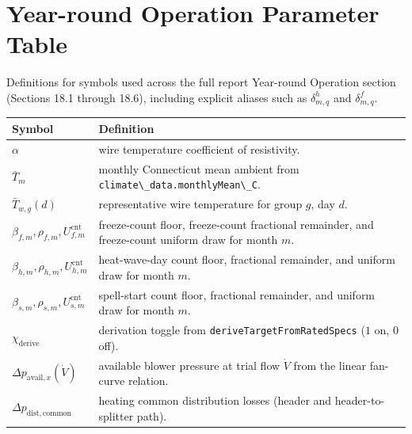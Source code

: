 \section{Year-round Operation Parameter
Table}\label{year-round-operation-parameter-table}

Definitions for symbols used across the full report Year-round Operation
section (Sections 18.1 through 18.6), including explicit aliases such as
\(\delta^h_{m,q}\) and \(\delta^f_{m,q}\).

{\def\LTcaptype{none} %
\begin{longtable}[]{@{}
  >{\raggedright\arraybackslash}p{}
  >{\raggedright\arraybackslash}p{}@{}}
\toprule\noalign{}
\begin{minipage}[b]{\linewidth}\raggedright
Symbol
\end{minipage} & \begin{minipage}[b]{\linewidth}\raggedright
Definition
\end{minipage} \\
\midrule\noalign{}
\endhead
\bottomrule\noalign{}
\endlastfoot
\(\alpha\) & wire temperature coefficient of resistivity. \\
\(\bar T_m\) & monthly Connecticut mean ambient from
\texttt{climate\textbackslash{}\_data.monthlyMean\textbackslash{}\_C}. \\
\(\bar T_{w,g}(d)\) & representative wire temperature for group \(g\),
day \(d\). \\
\(\beta_{f,m},\rho_{f,m},U_{f,m}^{\mathrm{cnt}}\) & freeze-count floor,
freeze-count fractional remainder, and freeze-count uniform draw for
month \(m\). \\
\(\beta_{h,m},\rho_{h,m},U_{h,m}^{\mathrm{cnt}}\) & heat-wave-day count
floor, fractional remainder, and uniform draw for month \(m\). \\
\(\beta_{s,m},\rho_{s,m},U_{s,m}^{\mathrm{cnt}}\) & spell-start count
floor, fractional remainder, and uniform draw for month \(m\). \\
\(\chi_{\mathrm{derive}}\) & derivation toggle from
\texttt{deriveTargetFromRatedSpecs} (\(1\) on, \(0\) off). \\
\(\Delta p_{\mathrm{avail},x}(\dot V)\) & available blower pressure at
trial flow \(\dot V\) from the linear fan-curve relation. \\
\(\Delta p_{\mathrm{dist,common}}\) & heating common distribution losses
(header and header-to-splitter path). \\

\end{longtable}}
